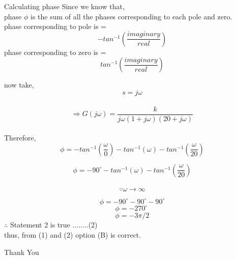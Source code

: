 \documentclass{beamer}
\begin{document}


\begin{frame}{Calculating phase}
Since we know that,\\
phase $ \phi $ is the sum of all the phases corresponding to each pole and zero.\\
phase corresponding to pole is = \[ - tan^{-1}( \frac{imaginary}{real}) \]
phase corresponding to zero is = \[tan^{-1}( \frac{imaginary}{real})\]

\end{frame}



now take,\[  s = j\omega  \]\\

 \[ \Rightarrow  G(j\omega) =  \frac{k}{j\omega(1+j\omega)(20+j\omega)}\]
 \\
Therefore, \\
 \[  \phi =  -tan^{-1}( {\frac{\omega}{0}}) - tan^{-1}(\omega) - tan^{-1}( \frac{\omega}{20})\]

  \[ \phi =  - 90^\circ - tan^{-1}(\omega) - tan^{-1}( \frac{\omega}{20})\]
  \\
  \[\because \omega \to \infty\] 


 
 \begin{frame}
  \[ \phi =   - 90^\circ - 90^\circ - 90^\circ\]
 \[\phi = -270^\circ\ \]
 \[\phi = -3\pi/2 \] 
\quad \quad \quad $\therefore$ Statement 2 is true \quad \quad \quad \quad ........(2)\\
 thus, from (1) and (2) option (B) is correct.
\end{frame}


\begin{frame}
\Huge{\centerline{Thank You}}
\end{frame}
\end{document}
